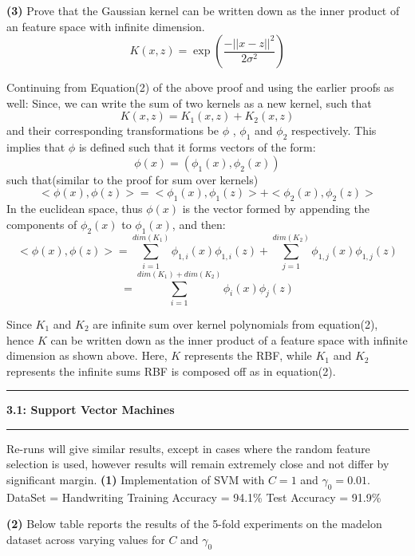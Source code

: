 \documentclass{article}
\newcommand\question[2]{\vspace{.25in}\hrule\textbf{#1: #2}\hrule\vspace{.10in}}
\renewcommand\part[1]{\vspace{.10in}\textbf{(#1)}}
\begin{document}
    \part{3} Prove that the Gaussian kernel can be written down as the inner product of an feature space with infinite dimension. 
    \[K(x,z) = \exp(\dfrac{-||x-z||^2}{2{\sigma}^2})\]

    Continuing from Equation(2) of the above proof and using the earlier proofs as well: \newline
    Since, we can write the sum of two kernels as a new kernel, such that
    \[K(x,z) = K_1(x,z) + K_2(x,z)\]
    and their corresponding transformations be $\phi$ , $\phi_1$ and $\phi_2$ respectively. This implies that $\phi$ is defined such that it forms vectors of the form:
    \[ \phi(x) = (\phi_1(x), \phi_2(x))\]
    such that(similar to the proof for sum over kernels)
   \[ <\phi(x),\phi(z)>  =  <\phi_1(x), \phi_1(z)> + <\phi_2(x), \phi_2(z)>\]
   In the euclidean space, thus $\phi(x)$ is the vector formed by appending the components of $\phi_2(x)$ to $\phi_1(x)$, and then:
   \[<\phi(x), \phi(z)>  =  \sum_{i=1}^{dim(K_1)} \phi_{1,i}(x)\phi_{1,i}(z) + \sum_{j=1}^{dim(K_2)} \phi_{1,j}(x)\phi_{1,j}(z)\]
   \[ = \sum_{i=1}^{dim(K_1)+dim(K_2)} \phi_{i}(x)\phi_{j}(z)\]

   Since $K_1$ and $K_2$ are infinite sum over kernel polynomials from equation(2), hence $K$ can be written down as the inner product of a feature space with infinite dimension as shown above. Here, $K$ represents the RBF, while $K_1$ and $K_2$ represents the infinite sums RBF is composed off as in equation(2). \newline

   \question{3.1}{Support Vector Machines}
   Re-runs will give similar results, except in cases where the random feature selection is used, however results will remain extremely close and not differ by significant margin. \newline
   \part{1} Implementation of SVM with $C=1$ and $\gamma_0 = 0.01$. \newline
   DataSet = Handwriting \newline
   Training Accuracy = 94.1\% \newline
   Test Accuracy = 91.9\% \newline

   \part{2} Below table reports the results of the 5-fold experiments on the madelon dataset across varying values for $C$ and $\gamma_0$
  
\end{document}
